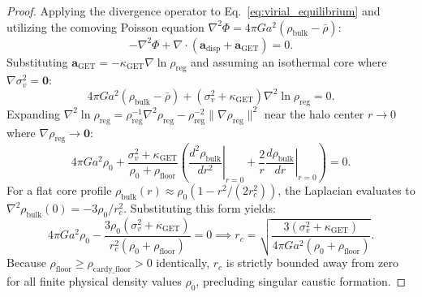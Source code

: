 \documentclass[11pt]{article}
\theoremstyle{plain}
\begin{document}
\begin{proof}
Applying the divergence operator to Eq.~\eqref{eq:virial_equilibrium} and utilizing the comoving Poisson equation $\nabla^2 \Phi = 4\pi G a^2 (\rho_{\mathrm{bulk}} - \bar{\rho})$:
\begin{equation}
-\nabla^2 \Phi + \nabla \cdot \left( \mathbf{a}_{\mathrm{disp}} + \mathbf{a}_{\mathrm{GET}} \right) = 0.
\end{equation}
Substituting $\mathbf{a}_{\mathrm{GET}} = -\kappa_{\mathrm{GET}} \nabla \ln \rho_{\mathrm{reg}}$ and assuming an isothermal core where $\nabla \sigma_v^2 = \mathbf{0}$:
\begin{equation}
4\pi G a^2 (\rho_{\mathrm{bulk}} - \bar{\rho}) + (\sigma_v^2 + \kappa_{\mathrm{GET}}) \nabla^2 \ln \rho_{\mathrm{reg}} = 0.
\end{equation}
Expanding $\nabla^2 \ln \rho_{\mathrm{reg}} = \rho_{\mathrm{reg}}^{-1} \nabla^2 \rho_{\mathrm{reg}} - \rho_{\mathrm{reg}}^{-2} \|\nabla \rho_{\mathrm{reg}}\|^2$ near the halo center $r \to 0$ where $\nabla \rho_{\mathrm{reg}} \to \mathbf{0}$:
\begin{equation}
4\pi G a^2 \rho_0 + \frac{\sigma_v^2 + \kappa_{\mathrm{GET}}}{\rho_0 + \rho_{\mathrm{floor}}} \left( \left. \frac{d^2 \rho_{\mathrm{bulk}}}{dr^2} \right|_{r=0} + \frac{2}{r} \left. \frac{d\rho_{\mathrm{bulk}}}{dr} \right|_{r=0} \right) = 0.
\end{equation}
For a flat core profile $\rho_{\mathrm{bulk}}(r) \approx \rho_0 (1 - r^2 / (2 r_c^2))$, the Laplacian evaluates to $\nabla^2 \rho_{\mathrm{bulk}}(0) = -3\rho_0 / r_c^2$. Substituting this form yields:
\begin{equation}
4\pi G a^2 \rho_0 - \frac{3\rho_0 (\sigma_v^2 + \kappa_{\mathrm{GET}})}{r_c^2 (\rho_0 + \rho_{\mathrm{floor}})} = 0 \implies r_c = \sqrt{ \frac{3(\sigma_v^2 + \kappa_{\mathrm{GET}})}{4\pi G a^2 (\rho_0 + \rho_{\mathrm{floor}})} }.
\end{equation}
Because $\rho_{\mathrm{floor}} \ge \rho_{\mathrm{cardy\_floor}} > 0$ identically, $r_c$ is strictly bounded away from zero for all finite physical density values $\rho_0$, precluding singular caustic formation.
\end{proof}
\end{document}
